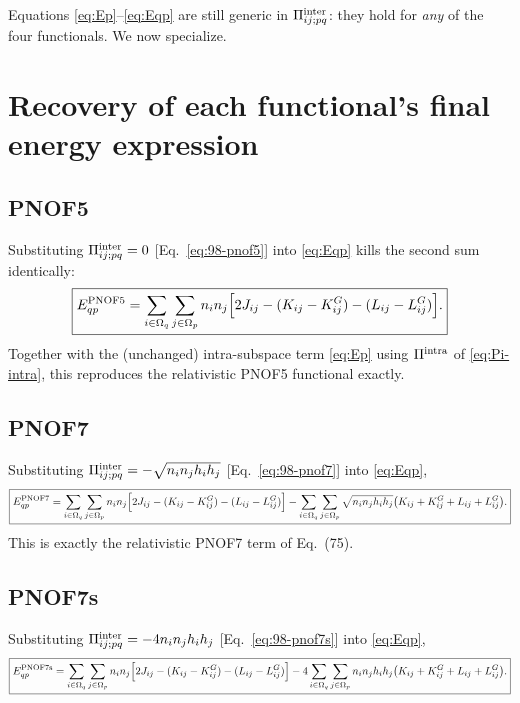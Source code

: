 \documentclass[11pt,a4paper]{article}
\newcommand{\PiMat}{\Pi}
\newcommand{\Om}{\Omega}
\newcommand{\hi}{h_i}
\newcommand{\hj}{h_j}
\begin{document}
Equations \eqref{eq:Ep}--\eqref{eq:Eqp} are still generic in
$\PiMat^{\rm inter}_{ij;pq}$: they hold for \emph{any} of the four
functionals. We now specialize.

\section{Recovery of each functional's final energy expression}
\label{sec:recovery}

\subsection{PNOF5}
Substituting $\PiMat^{\rm inter}_{ij;pq}=0$ [Eq.~\eqref{eq:98-pnof5}]
into \eqref{eq:Eqp} kills the second sum identically:
\begin{equation}
\boxed{
E_{qp}^{\rm PNOF5}=\sum_{i\in\Om_q}\sum_{j\in\Om_p}n_in_j\Big[2J_{ij}-(K_{ij}-K^G_{ij})-(L_{ij}-L^G_{ij})\Big].
}
\label{eq:PNOF5-final}
\end{equation}
Together with the (unchanged) intra-subspace term \eqref{eq:Ep} using
$\PiMat^{\rm intra}$ of \eqref{eq:Pi-intra}, this reproduces the
relativistic PNOF5 functional exactly.

\subsection{PNOF7}
Substituting $\PiMat^{\rm inter}_{ij;pq}=-\sqrt{n_in_j\hi\hj}$
[Eq.~\eqref{eq:98-pnof7}] into \eqref{eq:Eqp},
\begin{equation}
\boxed{
E_{qp}^{\rm PNOF7}=\sum_{i\in\Om_q}\sum_{j\in\Om_p}n_in_j\Big[2J_{ij}-(K_{ij}-K^G_{ij})-(L_{ij}-L^G_{ij})\Big]
-\sum_{i\in\Om_q}\sum_{j\in\Om_p}\sqrt{n_in_j\hi\hj}\big(K_{ij}+K^G_{ij}+L_{ij}+L^G_{ij}\big).
}
\label{eq:PNOF7-final}
\end{equation}
This is exactly the relativistic PNOF7 term of Eq.~(75).

\subsection{PNOF7s}
Substituting $\PiMat^{\rm inter}_{ij;pq}=-4n_in_j\hi\hj$
[Eq.~\eqref{eq:98-pnof7s}] into \eqref{eq:Eqp},
\begin{equation}
\boxed{
E_{qp}^{\rm PNOF7s}=\sum_{i\in\Om_q}\sum_{j\in\Om_p}n_in_j\Big[2J_{ij}-(K_{ij}-K^G_{ij})-(L_{ij}-L^G_{ij})\Big]
-4\sum_{i\in\Om_q}\sum_{j\in\Om_p}n_in_j\hi\hj\big(K_{ij}+K^G_{ij}+L_{ij}+L^G_{ij}\big).
}
\label{eq:PNOF7s-final}
\end{equation}
\end{document}
